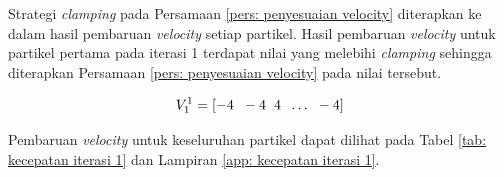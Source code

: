 {{\begin{enumerate}[align = left, left = 0cm, nolistsep]
              Strategi \textit{clamping} pada Persamaan \ref{pers: penyesuaian velocity} diterapkan ke dalam hasil pembaruan \textit{velocity} setiap partikel.
              Hasil pembaruan \textit{velocity} untuk partikel pertama pada iterasi 1 terdapat nilai yang melebihi \textit{clamping} sehingga diterapkan Persamaan \ref{pers: penyesuaian velocity} pada nilai tersebut.

              \begin{equation*}
                  V_{1}^{1} = [-4\hspace{2mm} -4\hspace{2mm} 4\hspace{2mm} \dots\hspace{2mm} -4]
              \end{equation*}

              Pembaruan \textit{velocity} untuk keseluruhan partikel dapat dilihat pada Tabel \ref{tab: kecepatan iterasi 1} dan Lampiran \ref{app: kecepatan iterasi 1}.


\end{enumerate}}}
